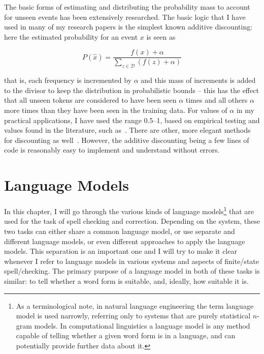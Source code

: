 \documentclass[officiallayout,final]{unihelcompling}
\begin{document}
The basic forms of estimating and distributing the probability mass to account
for unseen events has been extensively researched. The basic logic that I have
used in many of my research papers is the simplest known additive discounting:
here the estimated probability for an event $x$ is seen as

\begin{equation}
    P(\hat{x}) = \frac{f(x) + \alpha}{\sum_{z \in \mathcal{D}}(f(z) + \alpha)}
\end{equation}

\noindent that is, each frequency is incremented by $\alpha$ and this mass
of increments is added to the divisor to keep the distribution in probabilistic
bounds -- this has the effect that all unseen tokens are considered to have been
seen $\alpha$ times and all others $\alpha$ more times than they have been seen
in the training data.  For values of $\alpha$ in my practical applications, I
have used the range 0.5--1, based on empirical testing and values found in the
literature, such as~\citet{manning1999foundations}. There are other, more
elegant methods for discounting as well~\citep{chen1999empirical}. However,
the additive discounting being a few lines of code is reasonably easy to
implement and understand without errors.


\chapter{Language Models}
\label{chap:language-models}

In this chapter, I will go through the various kinds of
\glspl{language model}\footnote{As a terminological note, in \gls{natural language
    engineering} the term language model is used narrowly, referring only
    to systems that are purely statistical \(n\)-gram models. In
    computational linguistics a language model is any method capable of
    telling whether a given word form is in a language, and can potentially
    provide further data about it.} that are
used for the task of spell checking and correction.  Depending on the system,
these two tasks can either share a common language model, or use separate and
different language models, or even different approaches to apply the language
models. This separation is an important one and I will try to make it clear
whenever I refer to language models in various systems and aspects of
finite\-/state spell\-/checking.  The primary purpose of a language model in
both of these tasks is similar: to tell whether a word form is suitable, and,
ideally, how suitable it is.
\end{document}
